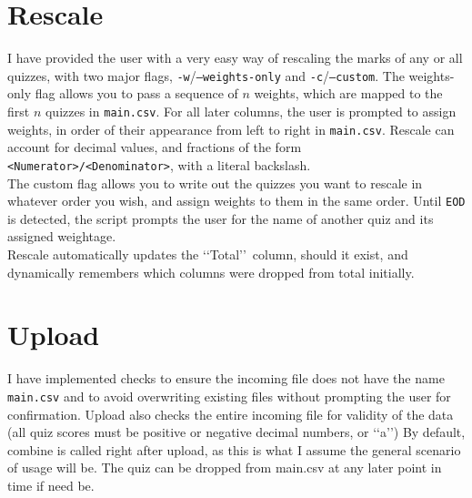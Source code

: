 \documentclass{article}
\begin{document}
    \section{Rescale}
    I have provided the user with a very easy way of rescaling the marks of any or all quizzes, with two major flags, \texttt{-w}/\texttt{--weights-only} and \texttt{-c}/\texttt{--custom}.
    The weights-only flag allows you to pass a sequence of $n$ weights, which are mapped to the first $n$ quizzes in \texttt{main.csv}.
    For all later columns, the user is prompted to assign weights, in order of their appearance from left to right in \texttt{main.csv}.
    Rescale can account for decimal values, and fractions of the form \texttt{\textless Numerator\textgreater/\textless Denominator\textgreater}, with a literal backslash.
    \\
    The custom flag allows you to write out the quizzes you want to rescale in whatever order you wish, and assign weights to them in the same order.
    Until \texttt{EOD} is detected, the script prompts the user for the name of another quiz and its assigned weightage.
    \\
    Rescale automatically updates the \lq\lq Total\rq\rq\ column, should it exist, and dynamically remembers which columns were dropped from total initially.

    \section{Upload}
    I have implemented checks to ensure the incoming file does not have the name \texttt{main.csv} and to avoid overwriting existing files without prompting the user for confirmation.
    Upload also checks the entire incoming file for validity of the data (all quiz scores must be positive or negative decimal numbers, or \lq\lq a\rq\rq)
    By default, combine is called right after upload, as this is what I assume the general scenario of usage will be. The quiz can be dropped from main.csv at any later point in time if need be.
\end{document}
